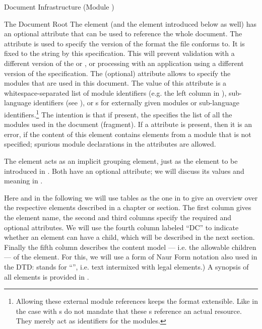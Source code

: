 \begin{tchapter}[id=omdoc-infrastructure,short=Document Infrastructure]{Document Infrastructure (Module {})}
\begin{tsection}[id=root]{The Document Root}
  The {} element (and the {} element introduced below as
  well) has an optional attribute {} that can be used to
  reference the whole document. The {} attribute is used to
  specify the version of the {\omdoc} format the file conforms to.  It is fixed to the
  string {} by this specification.  This will prevent validation with a
  different version of the {} or {}, or processing with an
  application using a different version of the {\omdoc} specification. The (optional)
  attribute {} allows to specify the {\omdoc} modules that are
  used in this document. The value of this attribute is a whitespace-separated list of
  module identifiers (e.g. {} the left column in
  {}), {\omdoc} sub-language identifiers (see
  {}), or {s} for externally given
  {\omdoc} modules or sub-language identifiers.\footnote{Allowing these external module
    references keeps the {\omdoc} format extensible. Like in the case with
    {s} {\omdoc} do not mandate that these
    {s} reference an actual resource. They merely act as
    identifiers for the modules.} The intention is that if present, the
  {} specifies the list of all the modules used in the document
  (fragment).  If a {} attribute is present, then it is an error,
  if the content of this element contains elements from a module that is not specified;
  spurious module declarations in the {} attributes are allowed.
  
  The {} element acts as an implicit grouping element, just as the
  {} element to be introduced in {}. Both have an
  optional {} attribute; we will discuss its values and meaning in
  {}.
  
  Here and in the following we will use tables as the one in {} to
  give an overview over the respective {\omdoc} elements described in a chapter or
  section.  The first column gives the element name, the second and third columns specify
  the required and optional attributes. We will use the fourth column labeled ``DC'' to
  indicate whether an {\omdoc} element can have a {} child, which will
  be described in the next section.  Finally the fifth column describes the content model
  --- i.e. the allowable children --- of the element. For this, we will use a form of
  {} Naur
  Form notation also used in the DTD:
  {} stands for ``{}'', i.e. text
  intermixed with legal {\omdoc} elements.) A synopsis of all elements is provided in
  {}.


\end{tsection}
\end{tchapter}
